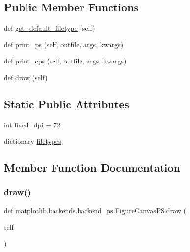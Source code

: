 \subsection*{Public Member Functions}
\begin{DoxyCompactItemize}
\item 
def \hyperlink{classmatplotlib_1_1backends_1_1backend__ps_1_1FigureCanvasPS_af4b9dec076451d59e7259c5064f7f4c8}{get\+\_\+default\+\_\+filetype} (self)
\item 
def \hyperlink{classmatplotlib_1_1backends_1_1backend__ps_1_1FigureCanvasPS_aeb55e77f05ad97249b6cc2eee708f55c}{print\+\_\+ps} (self, outfile, args, kwargs)
\item 
def \hyperlink{classmatplotlib_1_1backends_1_1backend__ps_1_1FigureCanvasPS_a5d0e54a4423d7736bede3b2686fb9b01}{print\+\_\+eps} (self, outfile, args, kwargs)
\item 
def \hyperlink{classmatplotlib_1_1backends_1_1backend__ps_1_1FigureCanvasPS_a0ce501b81363cfbf0a294cb97de9461b}{draw} (self)
\end{DoxyCompactItemize}
\subsection*{Static Public Attributes}
\begin{DoxyCompactItemize}
\item 
int \hyperlink{classmatplotlib_1_1backends_1_1backend__ps_1_1FigureCanvasPS_a964979d96050c61529b6ca634dd6c760}{fixed\+\_\+dpi} = 72
\item 
dictionary \hyperlink{classmatplotlib_1_1backends_1_1backend__ps_1_1FigureCanvasPS_a2abbeff3c2521ebc32543f4cb3d6036f}{filetypes}
\end{DoxyCompactItemize}


\subsection{Member Function Documentation}
\mbox{\label{classmatplotlib_1_1backends_1_1backend__ps_1_1FigureCanvasPS_a0ce501b81363cfbf0a294cb97de9461b}} 
\subsubsection{\texorpdfstring{draw()}{draw()}}
{\footnotesize\ttfamily def matplotlib.\+backends.\+backend\+\_\+ps.\+Figure\+Canvas\+P\+S.\+draw (\begin{DoxyParamCaption}\item[{}]{self }\end{DoxyParamCaption})}

